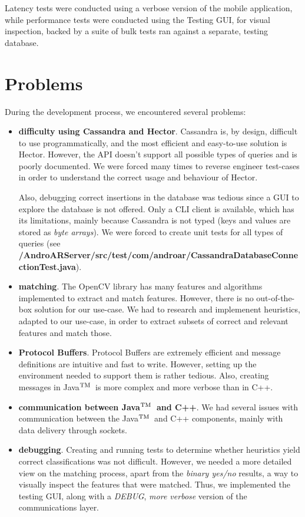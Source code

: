 \documentclass[a4paper,onecolumn,oneside,titlepage,11pt]{report}
\def\tm{\leavevmode\hbox{$\rm {}^{TM}$}}
\begin{document}
Latency tests were conducted using a verbose version of the mobile application, while performance tests were conducted using the Testing GUI, for visual inspection, backed by a suite of bulk tests ran against a separate, testing database.
\section{Problems}
During the development process, we encountered several problems:
\begin{itemize}
	\item \textbf{difficulty using Cassandra and Hector}. Cassandra is, by design, difficult to use programmatically, and the most efficient and easy-to-use solution is Hector. However, the API doesn't support all possible types of queries and is poorly documented. We were forced many times to reverse engineer test-cases in order to understand the correct usage and behaviour of Hector. 
	
	Also, debugging correct insertions in the database was tedious since a GUI to explore the database is not offered. Only a CLI client is available, which has its limitations, mainly because Cassandra is not typed (keys and values are stored as \emph{byte arrays}). We were forced to create unit tests for all types of queries (see \textbf{/AndroARServer/src/test/com/androar/CassandraDatabaseConnectionTest.java}).
	\item \textbf{matching}. The OpenCV library has many features and algorithms implemented to extract and match features. However, there is no out-of-the-box solution for our use-case. We had to research and implemenent heuristics, adapted to our use-case, in order to extract subsets of correct and relevant features and match those.
	\item \textbf{Protocol Buffers}. Protocol Buffers are extremely efficient and message definitions are intuitive and fast to write. However, setting up the environment needed to support them is rather tedious. Also, creating messages in Java\tm\ is more complex and more verbose than in C++.
	\item \textbf{communication between Java\tm\ and C++}. We had several issues with communication between the Java\tm\ and C++ components, mainly with data delivery through sockets.
	\item \textbf{debugging}. Creating and running tests to determine whether heuristics yield correct classifications was not difficult. However, we needed a more detailed view on the matching process, apart from the \emph{binary yes/no} results, a way to visually inspect the features that were matched. Thus, we implemented the testing GUI, along with a \emph{DEBUG}, \emph{more verbose} version of the communications layer.
	

\end{itemize}
\end{document}
